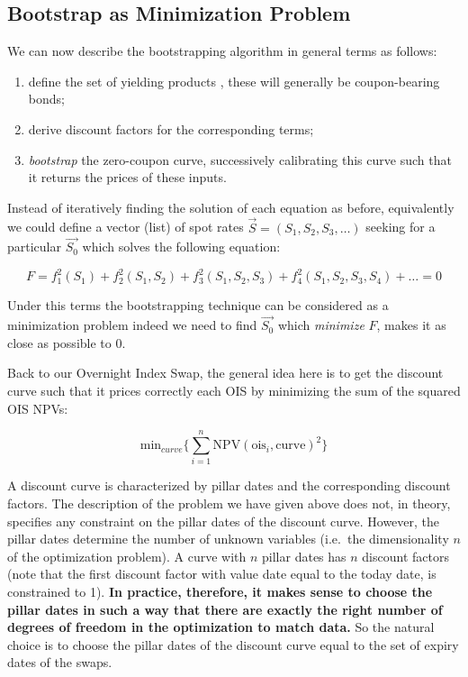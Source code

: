 \subsection{Bootstrap as Minimization Problem}
We can now describe the bootstrapping algorithm in general terms as follows:
\begin{enumerate}
\item define the set of yielding products , these will generally be coupon-bearing bonds;
\item derive discount factors for the corresponding terms;
\item \emph{bootstrap} the zero-coupon curve, successively calibrating this curve such that it returns the prices of these inputs.
\end{enumerate}

Instead of iteratively finding the solution of each equation as before, equivalently we could define a vector (list) of spot rates $\vec{S} = (S_1, S_2, S_3, \ldots)$ seeking for a particular $\vec{S_0}$ which solves the following equation:

\begin{equation*}
F = f_1^2(S_1) + f_2^2(S_1, S_2) + f_3^2(S_1, S_2, S_3) + f_4^2(S_1, S_2, S_3, S_4) + \ldots = 0
\end{equation*}

Under this terms the bootstrapping technique can be considered as a minimization problem indeed we need to find $\vec{S_0}$ which \emph{minimize} $F$, makes it as close as possible to 0.

Back to our Overnight Index Swap, the general idea here is to get the discount curve such that it prices correctly each OIS by minimizing the sum of the squared OIS NPVs:

\[\mathrm{min}_{curve} \Big\{\sum_{i=1}^{n}\mathrm{NPV}(\mathrm{ois}_i, \mathrm{curve})^2\Big\}\]

A discount curve is characterized by pillar dates and the corresponding discount factors. The description of the problem we have given above does not, in theory, specifies any constraint on the pillar dates of the discount curve. However, the pillar dates determine the number of unknown variables (i.e.~the dimensionality \(n\) of the optimization problem). A curve with \(n\) pillar dates has \(n\) discount factors (note that the first discount factor with value date equal to the today date, is constrained to 1). \textbf{In practice, therefore, it makes sense to choose the pillar dates in such a way that there are exactly the right number of degrees of freedom in the optimization to match data.} So the natural choice is to choose the pillar dates of the discount curve equal to the set of expiry dates of the swaps.

